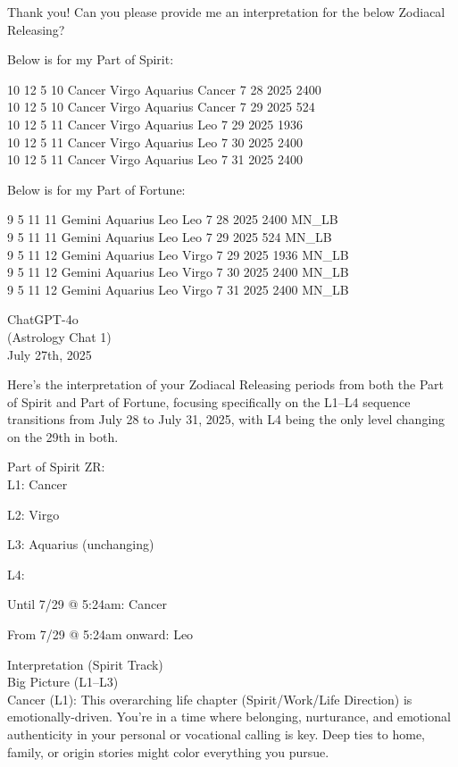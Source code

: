 \documentclass{article}
\begin{document}
Thank you! Can you please provide me an interpretation for the below Zodiacal Releasing?

Below is for my Part of Spirit:

10 12 5 10 Cancer Virgo Aquarius Cancer 7 28 2025 2400\\
10 12 5 10 Cancer Virgo Aquarius Cancer 7 29 2025 524\\
10 12 5 11 Cancer Virgo Aquarius Leo 7 29 2025 1936\\
10 12 5 11 Cancer Virgo Aquarius Leo 7 30 2025 2400\\
10 12 5 11 Cancer Virgo Aquarius Leo 7 31 2025 2400

Below is for my Part of Fortune:

9 5 11 11 Gemini Aquarius Leo Leo 7 28 2025 2400 MN\_LB\\
9 5 11 11 Gemini Aquarius Leo Leo 7 29 2025 524 MN\_LB\\
9 5 11 12 Gemini Aquarius Leo Virgo 7 29 2025 1936 MN\_LB\\
9 5 11 12 Gemini Aquarius Leo Virgo 7 30 2025 2400 MN\_LB\\
9 5 11 12 Gemini Aquarius Leo Virgo 7 31 2025 2400 MN\_LB

ChatGPT-4o\\
(Astrology Chat 1)\\
July 27th, 2025

Here's the interpretation of your Zodiacal Releasing periods from both the Part of Spirit and Part of Fortune, focusing specifically on the L1--L4 sequence transitions from July 28 to July 31, 2025, with L4 being the only level changing on the 29th in both.

Part of Spirit ZR:\\
L1: Cancer

L2: Virgo

L3: Aquarius (unchanging)

L4:

Until 7/29 @ 5:24am: Cancer

From 7/29 @ 5:24am onward: Leo

Interpretation (Spirit Track)\\
Big Picture (L1--L3)\\
Cancer (L1): This overarching life chapter (Spirit/Work/Life Direction) is emotionally-driven. You're in a time where belonging, nurturance, and emotional authenticity in your personal or vocational calling is key. Deep ties to home, family, or origin stories might color everything you pursue.
\end{document}
